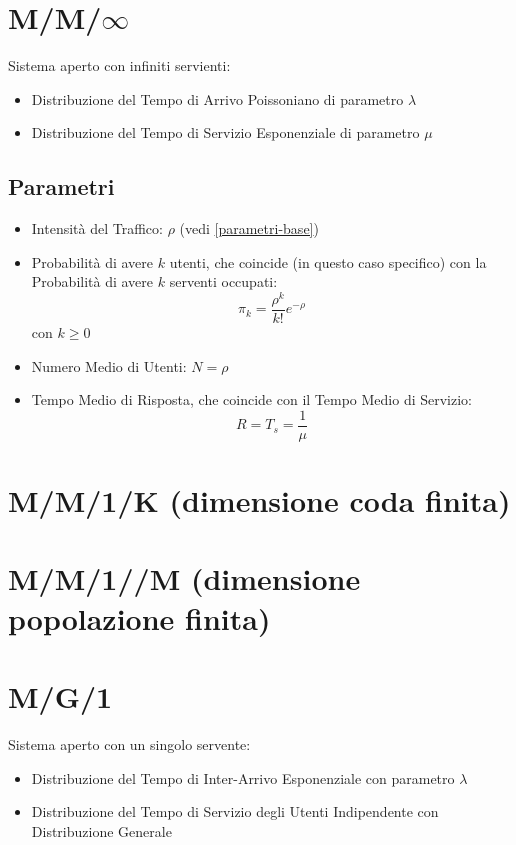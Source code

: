 \section{M/M/\texorpdfstring{$\infty$}{infinito}}

Sistema aperto con infiniti servienti:

\begin{itemize}
    \item Distribuzione del Tempo di Arrivo Poissoniano di parametro $\lambda$
    \item Distribuzione del Tempo di Servizio Esponenziale di parametro $\mu$
\end{itemize}

\subsection{Parametri}

\begin{itemize}
    \item Intensità del Traffico: $\rho$ (vedi \ref{parametri-base})
    \item Probabilità di avere $k$ utenti, che coincide (in questo caso
          specifico) con la Probabilità di avere $k$ serventi occupati: $$\pi_k =
              \frac{\rho^k}{k!} e^{-\rho}$$ con $k \geq 0$
    \item Numero Medio di Utenti: $N = \rho$
    \item Tempo Medio di Risposta, che coincide con il Tempo Medio di Servizio:
          $$R = T_s = \frac{1}{\mu}$$
\end{itemize}

\section{M/M/1/K (dimensione coda finita)}

\section{M/M/1//M (dimensione popolazione finita)}

\section{M/G/1} \label{mg1}

Sistema aperto con un singolo servente:

\begin{itemize}
    \item Distribuzione del Tempo di Inter-Arrivo Esponenziale con parametro
          $\lambda$
    \item Distribuzione del Tempo di Servizio degli Utenti Indipendente con
          Distribuzione Generale
\end{itemize}

